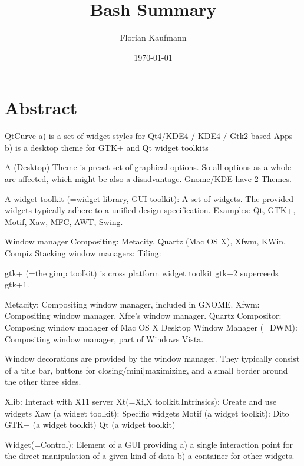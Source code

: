 
\author{Florian Kaufmann}
\title{Bash Summary}
\date{\today}
\maketitle
\tableofcontents

\section{Abstract}

QtCurve a) is a set of widget styles for Qt4/KDE4 / KDE4 / Gtk2 based
Apps b) is a desktop theme for GTK+ and Qt widget toolkits

A (Desktop) Theme is preset set of graphical options. So all options as
  a whole are affected, which might be also a disadvantage. Gnome/KDE
  have 2 Themes.

A widget toolkit (=widget library, GUI toolkit): A set of widgets. The
provided widgets typically adhere to a unified design specification.
Examples: Qt, GTK+, Motif, Xaw, MFC, AWT, Swing.

Window manager
  Compositing: Metacity, Quartz (Mac OS X), Xfwm, KWin, Compiz
  Stacking window managers: 
  Tiling:

gtk+ (=the gimp toolkit) is cross platform widget toolkit
gtk+2 superceeds gtk+1. 

  
Metacity: Compositing window manager, included in GNOME.
Xfwm: Compositing window manager, Xfce's window manager.
Quartz Compositor: Composing window manager of Mac OS X
Desktop Window Manager (=DWM): Compositing window manager, part of
Windows Vista.

Window decorations are provided by the window manager. They typically
consist of a title bar, buttons for closing/mini|maximizing, and a small
border around the other three sides.

Xlib: Interact with X11 server
  Xt(=Xi,X toolkit,Intrinsics): Create and use widgets
    Xaw (a widget toolkit): Specific widgets
    Motif (a widget toolkit): Dito
  GTK+ (a widget toolkit)
  Qt (a widget toolkit)
    

Widget(=Control): Element of a GUI providing a) a single interaction point
for the direct manipulation of a given kind of data b) a container for
other widgets.


